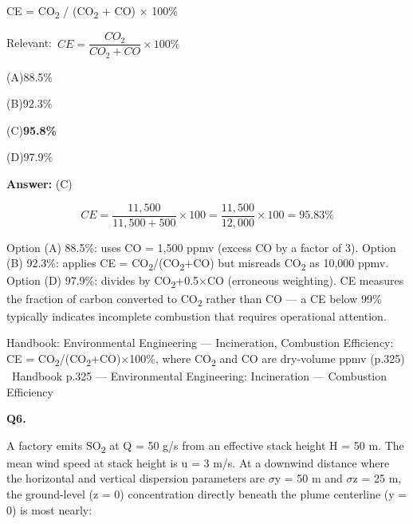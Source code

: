 \documentclass[11pt]{article}
\newcommand{\correct}[1]{\textbf{#1}\;{\color{accent}$\checkmark$}}
\newcommand{\optline}[2]{\par\noindent\hspace{1.2em}(#1)\hspace{0.6em}#2}
\begin{document}
CE = CO\textsubscript{2} / (CO\textsubscript{2} + CO) $\times$ 100\%\par\vspace{3pt}
{\small\color{soft}Relevant:}\ $CE = \dfrac{CO_2}{CO_2 + CO} \times 100\%$\par\vspace{3pt}
\optline{A}{88.5\%}
\optline{B}{92.3\%}
\optline{C}{\correct{95.8\%}}
\optline{D}{97.9\%}
\par\vspace{3pt}
\vspace{2pt}\par\noindent\colorbox{boxbg}{\parbox{\dimexpr\linewidth-2\fboxsep\relax}{%
\vspace{2pt}\textbf{Answer:} (C)\par\vspace{2pt}
{\small \[CE = \frac{11{,}500}{11{,}500 + 500} \times 100 = \frac{11{,}500}{12{,}000} \times 100 = 95.83\%\]

Option (A) 88.5\%: uses CO = 1,500 ppmv (excess CO by a factor of 3). Option (B) 92.3\%: applies CE = CO\textsubscript{2}/(CO\textsubscript{2}+CO) but misreads CO\textsubscript{2} as 10,000 ppmv. Option (D) 97.9\%: divides by CO\textsubscript{2}+0.5$\times$CO (erroneous weighting). CE measures the fraction of carbon converted to CO\textsubscript{2} rather than CO --- a CE below 99\% typically indicates incomplete combustion that requires operational attention.}\par\vspace{2pt}
{\footnotesize\color{soft}Handbook: Environmental Engineering --- Incineration, Combustion Efficiency: CE = CO\textsubscript{2}/(CO\textsubscript{2}+CO)$\times$100\%, where CO\textsubscript{2} and CO are dry-volume ppmv (p.325) \textbullet\ Handbook p.325 --- Environmental Engineering: Incineration --- Combustion Efficiency}\vspace{2pt}
}}
\vspace{9pt}
\filbreak
\textbf{\color{accent}Q6.}\par\vspace{2pt}
A factory emits SO\textsubscript{2} at Q = 50 g/s from an effective stack height H = 50 m. The mean wind speed at stack height is u = 3 m/s. At a downwind distance where the horizontal and vertical dispersion parameters are $\sigma$y = 50 m and $\sigma$z = 25 m, the ground-level (z = 0) concentration directly beneath the plume centerline (y = 0) is most nearly:
\end{document}
